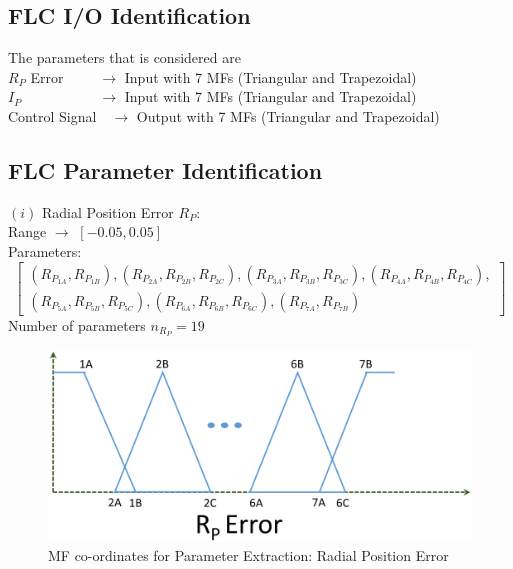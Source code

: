 \subsection{FLC I/O Identification}
The parameters that is considered are \\
$R_P$ Error~~~~~$\rightarrow$ Input with 7 MFs (Triangular and Trapezoidal) \\
$I_P$~~~~~~~~~~~$\rightarrow$ Input with 7 MFs (Triangular and Trapezoidal) \\
Control Signal~~$\rightarrow$ Output with 7 MFs (Triangular and Trapezoidal)

\subsection{FLC Parameter Identification} \label{sec:ident_param}
$ \left( i\right)  $ Radial Position Error $R_P$:\\
Range $\rightarrow$ $ \left[ -0.05, 0.05\right] $ \\
Parameters:
\[\left[ \begin{array}{l}
\left( {{R_{{P_{1A}}}},{R_{{P_{1B}}}}} \right),\left( {{R_{{P_{2A}}}},{R_{{P_{2B}}}},{R_{{P_{2C}}}}} \right),\left( {{R_{{P_{3A}}}},{R_{{P_{3B}}}},{R_{{P_{3C}}}}} \right),\left( {{R_{{P_{4A}}}},{R_{{P_{4B}}}},{R_{{P_{4C}}}}} \right),\\
\left( {{R_{{P_{5A}}}},{R_{{P_{5B}}}},{R_{{P_{5C}}}}} \right),\left( {{R_{{P_{6A}}}},{R_{{P_{6B}}}},{R_{{P_{6C}}}}} \right),\left( {{R_{{P_{7A}}}},{R_{{P_{7B}}}}} \right)
\end{array} \right]\]
Number of parameters $n_{R_P} = 19$
\begin{figure}[h!]
\centering
\includegraphics[width=0.95\linewidth]{Chapter5/chapter5/Fig7_FCP_Rp}
\caption{MF co-ordinates for Parameter Extraction: Radial Position Error}
\label{fig:Fig5_7}
\end{figure}

